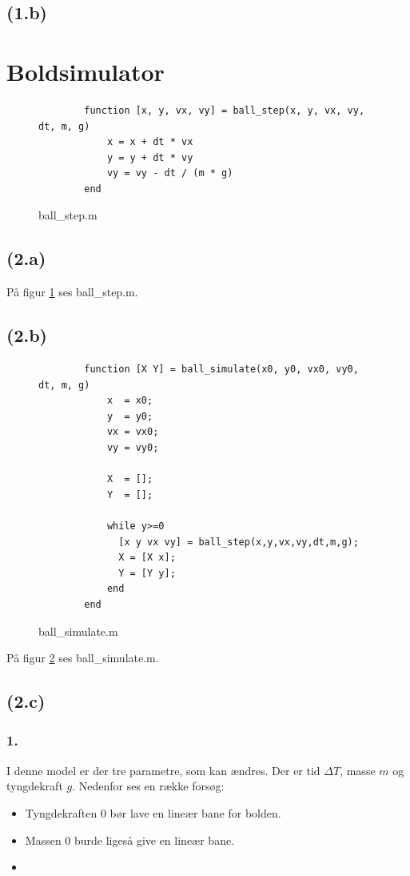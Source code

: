 \documentclass{article}
\begin{document}
\subsection*{(1.b)}

\section{Boldsimulator}

\begin{figure}
	\begin{verbatim}
		function [x, y, vx, vy] = ball_step(x, y, vx, vy, dt, m, g)
		    x = x + dt * vx
		    y = y + dt * vy
		    vy = vy - dt / (m * g)
		end
	\end{verbatim}
	\caption{ball\_step.m}
	\label{ballsinmyass}
\end{figure}

\subsection*{(2.a)}
På figur \ref{ballsinmyass} ses ball\_step.m.

\subsection*{(2.b)}
\begin{figure}
	\begin{verbatim}
		function [X Y] = ball_simulate(x0, y0, vx0, vy0, dt, m, g)
			x  = x0;
			y  = y0;
			vx = vx0;
			vy = vy0;

			X  = [];
			Y  = [];

			while y>=0
			  [x y vx vy] = ball_step(x,y,vx,vy,dt,m,g);
			  X = [X x];
			  Y = [Y y];
			end
		end
	\end{verbatim}
	\caption{ball\_simulate.m}
	\label{ballsims}
\end{figure}

På figur \ref{ballsims} ses ball\_simulate.m.

\subsection*{(2.c)}

\subsubsection*{1.}

I denne model er der tre parametre, som kan ændres. Der er tid $\Delta T$, masse $m$ og tyngdekraft $g$. Nedenfor ses en række forsøg:
\begin{itemize}
	\item Tyngdekraften 0 bør lave en lineær bane for bolden.
	\item Massen 0 burde ligeså give en lineær bane.
	\item 
\end{itemize}
\end{document}
